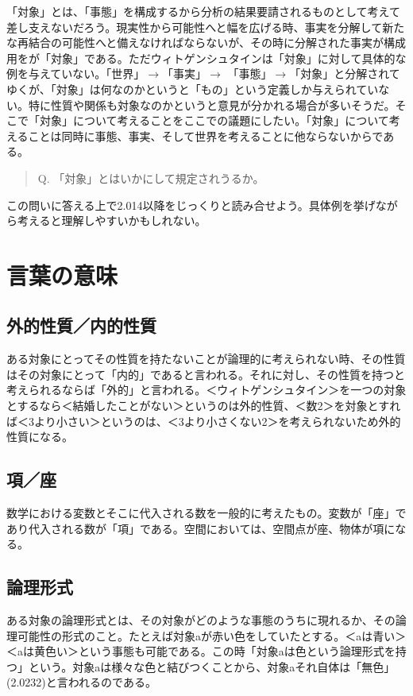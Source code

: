 \documentclass[a4paper,11pt]{jsarticle}
\begin{document}
「対象」とは、「事態」を構成するから分析の結果要請されるものとして考えて差し支えないだろう。現実性から可能性へと幅を広げる時、事実を分解して新たな再結合の可能性へと備えなければならないが、その時に分解された事実が構成用をが「対象」である。ただウィトゲンシュタインは「対象」に対して具体的な例を与えていない。「世界」$\rightarrow$「事実」$\rightarrow$ 「事態」$\rightarrow$「対象」と分解されてゆくが、「対象」は何なのかというと「もの」という定義しか与えられていない。特に性質や関係も対象なのかというと意見が分かれる場合が多いそうだ。そこで「対象」について考えることをここでの議題にしたい。「対象」について考えることは同時に事態、事実、そして世界を考えることに他ならないからである。
\begin{quote}
Q. 「対象」とはいかにして規定されうるか。
\end{quote}
この問いに答える上で2.014以降をじっくりと読み合せよう。具体例を挙げながら考えると理解しやすいかもしれない。

\section{言葉の意味}
\subsection{外的性質／内的性質}
ある対象にとってその性質を持たないことが論理的に考えられない時、その性質はその対象にとって「内的」であると言われる。それに対し、その性質を持つと考えられるならば「外的」と言われる。＜ウィトゲンシュタイン＞を一つの対象とするなら＜結婚したことがない＞というのは外的性質、＜数2＞を対象とすれば＜3より小さい＞というのは、＜3より小さくない2＞を考えられないため外的性質になる。

\subsection{項／座}
数学における変数とそこに代入される数を一般的に考えたもの。変数が「座」であり代入される数が「項」である。空間においては、空間点が座、物体が項になる。

\subsection{論理形式}
ある対象の論理形式とは、その対象がどのような事態のうちに現れるか、その論理可能性の形式のこと。たとえば対象aが赤い色をしていたとする。＜aは青い＞＜aは黄色い＞という事態も可能である。この時「対象aは色という論理形式を持つ」という。対象aは様々な色と結びつくことから、対象aそれ自体は「無色」(2.0232)と言われるのである。
\end{document}

